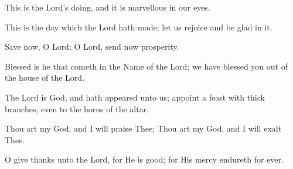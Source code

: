 This is the Lord's doing, and it is marvellous in our eyes.

This is the day which the Lord hath made; let us rejoice and be glad in it.

Save now, O Lord; O Lord, send now prosperity.

Blessed is he that cometh in the Name of the Lord; we have blessed you out of the house of the Lord.

The Lord is God, and hath appeared unto us; appoint a feast with thick branches, even to the horns of the altar.

Thou art my God, and I will praise Thee; Thou art my God, and I will exalt Thee.

O give thanks unto the Lord, for He is good; for His mercy endureth for ever.
